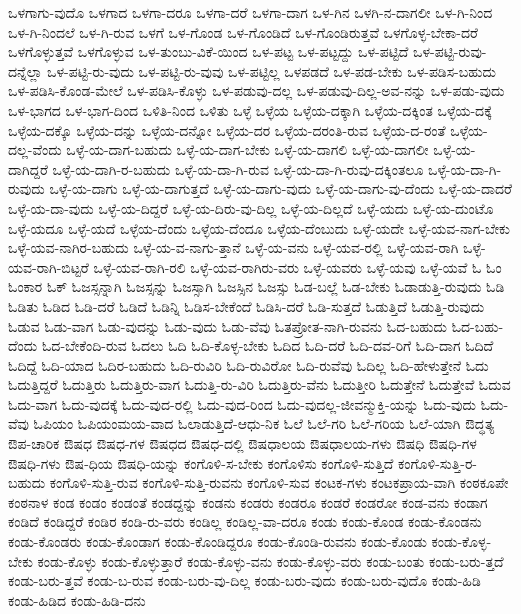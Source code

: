 {ಒಳಗಾಗು-ವುದೊ
ಒಳಗಾದ
ಒಳಗಾ-ದರೂ
ಒಳಗಾ-ದರೆ
ಒಳಗಾ-ದಾಗ
ಒಳ-ಗಿನ
ಒಳಗಿ-ನ-ದಾಗಲೀ
ಒಳ-ಗಿ-ನಿಂದ
ಒಳ-ಗಿ-ನಿಂದಲೆ
ಒಳ-ಗಿ-ರುವ
ಒಳಗೆ
ಒಳ-ಗೊಂಡ
ಒಳ-ಗೊಂಡಿದೆ
ಒಳ-ಗೊಂಡಿರುತ್ತವೆ
ಒಳಗೊಳ್ಳ-ಬೇಕಾ-ದರೆ
ಒಳಗೊಳ್ಳುತ್ತವೆ
ಒಳಗೊಳ್ಳುವ
ಒಳ-ತುಂಬು-ವಿಕೆ-ಯಿಂದ
ಒಳ-ಪಟ್ಟ
ಒಳ-ಪಟ್ಟದ್ದು
ಒಳ-ಪಟ್ಟಿದೆ
ಒಳ-ಪಟ್ಟಿ-ರುವು-ದನ್ನೆಲ್ಲಾ
ಒಳ-ಪಟ್ಟಿ-ರು-ವುದು
ಒಳ-ಪಟ್ಟಿ-ರು-ವುವು
ಒಳ-ಪಟ್ಟಿಲ್ಲ
ಒಳಪಡದೆ
ಒಳ-ಪಡ-ಬೇಕು
ಒಳ-ಪಡಿಸ-ಬಹುದು
ಒಳ-ಪಡಿಸಿ-ಕೊಂಡ-ಮೇಲೆ
ಒಳ-ಪಡಿಸಿ-ಕೊಳ್ಳು
ಒಳ-ಪಡುವು-ದಲ್ಲ
ಒಳ-ಪಡುವು-ದಿಲ್ಲ-ಅವ-ನನ್ನು
ಒಳ-ಪಡು-ವುದು
ಒಳ-ಭಾಗದ
ಒಳ-ಭಾಗ-ದಿಂದ
ಒಳಿತಿ-ನಿಂದ
ಒಳಿತು
ಒಳ್ಳೆ
ಒಳ್ಳೆಯ
ಒಳ್ಳೆಯ-ದಕ್ಕಾಗಿ
ಒಳ್ಳೆಯ-ದಕ್ಕಿಂತ
ಒಳ್ಳೆಯ-ದಕ್ಕೆ
ಒಳ್ಳೆಯ-ದಕ್ಕೊ
ಒಳ್ಳೆಯ-ದನ್ನು
ಒಳ್ಳೆಯ-ದನ್ನೋ
ಒಳ್ಳೆಯ-ದರ
ಒಳ್ಳೆಯ-ದರಂತಿ-ರುವ
ಒಳ್ಳೆಯ-ದ-ರಂತೆ
ಒಳ್ಳೆಯ-ದಲ್ಲ-ವೆಂದು
ಒಳ್ಳೆ-ಯ-ದಾಗ-ಬಹುದು
ಒಳ್ಳೆ-ಯ-ದಾಗ-ಬೇಕು
ಒಳ್ಳೆ-ಯ-ದಾಗಲಿ
ಒಳ್ಳೆ-ಯ-ದಾಗಲೀ
ಒಳ್ಳೆ-ಯ-ದಾಗಿದ್ದರೆ
ಒಳ್ಳೆ-ಯ-ದಾಗಿ-ರ-ಬಹುದು
ಒಳ್ಳೆ-ಯ-ದಾ-ಗಿ-ರುವ
ಒಳ್ಳೆ-ಯ-ದಾ-ಗಿ-ರುವು-ದಕ್ಕಿಂತಲೂ
ಒಳ್ಳೆ-ಯ-ದಾ-ಗಿ-ರುವುದು
ಒಳ್ಳೆ-ಯ-ದಾಗು
ಒಳ್ಳೆ-ಯ-ದಾಗುತ್ತದೆ
ಒಳ್ಳೆ-ಯ-ದಾಗು-ವುದು
ಒಳ್ಳೆ-ಯ-ದಾಗು-ವು-ದೆಂದು
ಒಳ್ಳೆ-ಯ-ದಾದರೆ
ಒಳ್ಳೆ-ಯ-ದಾ-ವುದು
ಒಳ್ಳೆ-ಯ-ದಿದ್ದರೆ
ಒಳ್ಳೆ-ಯ-ದಿರು-ವು-ದಿಲ್ಲ
ಒಳ್ಳೆ-ಯ-ದಿಲ್ಲದೆ
ಒಳ್ಳೆ-ಯದು
ಒಳ್ಳೆ-ಯ-ದುಂಟೊ
ಒಳ್ಳೆ-ಯದೂ
ಒಳ್ಳೆ-ಯದೆ
ಒಳ್ಳೆಯ-ದೆಂದು
ಒಳ್ಳೆಯ-ದೆಂದೂ
ಒಳ್ಳೆಯ-ದೆಂಬುದು
ಒಳ್ಳೆ-ಯದೇ
ಒಳ್ಳೆ-ಯವ-ನಾಗ-ಬೇಕು
ಒಳ್ಳೆ-ಯವ-ನಾಗಿರ-ಬಹುದು
ಒಳ್ಳೆ-ಯ-ವ-ನಾಗು-ತ್ತಾನೆ
ಒಳ್ಳೆ-ಯ-ವನು
ಒಳ್ಳೆ-ಯವ-ರಲ್ಲಿ
ಒಳ್ಳೆ-ಯವ-ರಾಗಿ
ಒಳ್ಳೆ-ಯವ-ರಾಗಿ-ಬಿಟ್ಟರೆ
ಒಳ್ಳೆ-ಯವ-ರಾಗಿ-ರಲಿ
ಒಳ್ಳೆ-ಯವ-ರಾಗಿರು-ವರು
ಒಳ್ಳೆ-ಯವರು
ಒಳ್ಳೆ-ಯವು
ಒಳ್ಳೆ-ಯವೆ
ಓ
ಓಂ
ಓಂಕಾರ
ಓಕ್
ಓಜಸ್ಸನ್ನಾಗಿ
ಓಜಸ್ಸನ್ನು
ಓಜಸ್ಸಾಗಿ
ಓಜಸ್ಸಿನ
ಓಜಸ್ಸು
ಓಡ-ಬಲ್ಲೆ
ಓಡ-ಬೇಕು
ಓಡಾಡುತ್ತಿ-ರುವುದು
ಓಡಿ
ಓಡಿತು
ಓಡಿದ
ಓಡಿ-ದರೆ
ಓಡಿದೆ
ಓಡಿನ್ನಿ
ಓಡಿಸ-ಬೇಕೆಂದೆ
ಓಡಿಸಿ-ದರೆ
ಓಡಿ-ಸುತ್ತದೆ
ಓಡುತ್ತಿದೆ
ಓಡುತ್ತಿ-ರುವುದು
ಓಡುವ
ಓಡು-ವಾಗ
ಓಡು-ವುದನ್ನು
ಓಡು-ವುದು
ಓಡು-ವೆವು
ಓತಪ್ರೋತ-ನಾಗಿ-ರುವನು
ಓದ-ಬಹುದು
ಓದ-ಬಹು-ದೆಂದು
ಓದ-ಬೇಕೆಂದಿ-ರುವ
ಓದಲು
ಓದಿ
ಓದಿ-ಕೊಳ್ಳ-ಬೇಕು
ಓದಿದ
ಓದಿ-ದರೆ
ಓದಿ-ದವ-ರಿಗೆ
ಓದಿ-ದಾಗ
ಓದಿದೆ
ಓದಿದ್ದೆ
ಓದಿ-ಯಾದ
ಓದಿರ-ಬಹುದು
ಓದಿ-ರುವಿರಿ
ಓದಿ-ರುವಿರೋ
ಓದಿ-ರುವೆವು
ಓದಿಲ್ಲ
ಓದಿ-ಹೇಳುತ್ತೇನೆ
ಓದು
ಓದುತ್ತಿದ್ದರೆ
ಓದುತ್ತಿರು
ಓದುತ್ತಿರು-ವಾಗ
ಓದುತ್ತಿ-ರು-ವಿರಿ
ಓದುತ್ತಿರು-ವೆನು
ಓದುತ್ತೀರಿ
ಓದುತ್ತೇನೆ
ಓದುತ್ತೇವೆ
ಓದುವ
ಓದು-ವಾಗ
ಓದು-ವುದಕ್ಕೆ
ಓದು-ವುದ-ರಲ್ಲಿ
ಓದು-ವುದ-ರಿಂದ
ಓದು-ವುದಲ್ಲ-ಜೀವನ್ಮುಕ್ತಿ-ಯನ್ನು
ಓದು-ವುದು
ಓದು-ವೆವು
ಓಪಿಯಂ
ಓಪಿಯಂಮಯ-ವಾದ
ಓಲಾಡುತ್ತಿದೆ-ಆಧು-ನಿಕ
ಓಲೆ
ಓಲೆ-ಗರಿ
ಓಲೆ-ಗರಿಯ
ಓಲೆ-ಯಾಗಿ
ಔದ್ಧತ್ಯ
ಔಪ-ಚಾರಿಕ
ಔಷಧ
ಔಷಧ-ಗಳ
ಔಷಧದ
ಔಷಧ-ದಲ್ಲಿ
ಔಷಧಾಲಯ
ಔಷಧಾಲಯ-ಗಳು
ಔಷಧಿ
ಔಷಧಿ-ಗಳ
ಔಷಧಿ-ಗಳು
ಔಷ-ಧಿಯ
ಔಷಧಿ-ಯನ್ನು
ಕಂಗೊಳಿ-ಸ-ಬೇಕು
ಕಂಗೊಳಿಸು
ಕಂಗೊಳಿ-ಸುತ್ತಿದೆ
ಕಂಗೊಳಿ-ಸುತ್ತಿ-ರ-ಬಹುದು
ಕಂಗೊಳಿ-ಸುತ್ತಿ-ರುವ
ಕಂಗೊಳಿ-ಸುತ್ತಿ-ರುವನು
ಕಂಗೊಳಿ-ಸುವ
ಕಂಟಕ-ಗಳು
ಕಂಟಕಪ್ರಾಯ-ವಾಗಿ
ಕಂಠಕೂಪೇ
ಕಂಠನಾಳ
ಕಂಡ
ಕಂಡಂ
ಕಂಡಂತೆ
ಕಂಡದ್ದನ್ನು
ಕಂಡನು
ಕಂಡರು
ಕಂಡರೂ
ಕಂಡರೆ
ಕಂಡರೋ
ಕಂಡ-ವನು
ಕಂಡಾಗ
ಕಂಡಿದೆ
ಕಂಡಿದ್ದರೆ
ಕಂಡಿರ
ಕಂಡಿ-ರು-ವರು
ಕಂಡಿಲ್ಲ
ಕಂಡಿಲ್ಲ-ವಾ-ದರೂ
ಕಂಡು
ಕಂಡು-ಕೊಂಡ
ಕಂಡು-ಕೊಂಡನು
ಕಂಡು-ಕೊಂಡರು
ಕಂಡು-ಕೊಂಡಾಗ
ಕಂಡು-ಕೊಂಡಿದ್ದರೂ
ಕಂಡು-ಕೊಂಡಿ-ರುವನು
ಕಂಡು-ಕೊಂಡು
ಕಂಡು-ಕೊಳ್ಳ-ಬೇಕು
ಕಂಡು-ಕೊಳ್ಳು
ಕಂಡು-ಕೊಳ್ಳುತ್ತಾರೆ
ಕಂಡು-ಕೊಳ್ಳು-ವನು
ಕಂಡು-ಕೊಳ್ಳು-ವರು
ಕಂಡು-ಬಂತು
ಕಂಡು-ಬರು-ತ್ತದೆ
ಕಂಡು-ಬರು-ತ್ತವೆ
ಕಂಡು-ಬ-ರುವ
ಕಂಡು-ಬರು-ವು-ದಿಲ್ಲ
ಕಂಡು-ಬರು-ವುದು
ಕಂಡು-ಬರು-ವುದೊ
ಕಂಡು-ಹಿಡಿ
ಕಂಡು-ಹಿಡಿದ
ಕಂಡು-ಹಿಡಿ-ದನು
}
